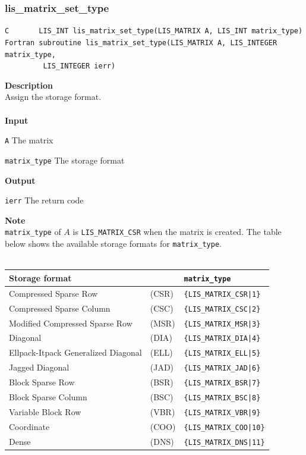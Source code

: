 \documentclass[a4paper]{article}
\newcommand{\namelistlabel}[1]{\mbox{#1}\hfill}
\newenvironment{namelist}[1]{%
\begin{list}{}
  {\let\makelabel\namelistlabel
  \settowidth{\labelwidth}{#1}
  \setlength{\leftmargin}{1.1\labelwidth}}
  }{%
\end{list}}
\begin{document}
\newpage
\subsubsection{lis\_matrix\_set\_type}
\begin{screen}
\verb|C       LIS_INT lis_matrix_set_type(LIS_MATRIX A, LIS_INT matrix_type)|
\verb|Fortran subroutine lis_matrix_set_type(LIS_MATRIX A, LIS_INTEGER matrix_type,|\\
\verb|         LIS_INTEGER ierr)|
\end{screen}
{\bf Description}\\
\indent
Assign the storage format.
\\ \\
\noindent
{\bf Input}
\begin{namelist}{XXXXXXXXXXXXXXXXXXXX}
\item[\tt A] The matrix
\item[\tt matrix\_type] The storage format
\end{namelist}
{\bf Output}
\begin{namelist}{XXXXXXXXXXXXXXXXXXXX}
\item[\tt ierr] The return code
\end{namelist}
\noindent
{\bf Note}\\
\indent
\verb+matrix_type+ of $A$ is \verb+LIS_MATRIX_CSR+ when the matrix is created. 
The table below shows the available storage formats for \verb+matrix_type+.
\\ \\
\begin{minipage}[t]{\textwidth}
\begin{center}
\begin{tabular}{lll}\hline\hline
Storage format  & & \verb|matrix_type| \\ \hline
Compressed Sparse Row & (CSR) & \verb={LIS_MATRIX_CSR|1}= \\
Compressed Sparse Column & (CSC) & \verb={LIS_MATRIX_CSC|2}= \\
Modified Compressed Sparse Row & (MSR) & \verb={LIS_MATRIX_MSR|3}= \\
Diagonal &(DIA) & \verb={LIS_MATRIX_DIA|4}= \\
Ellpack-Itpack Generalized Diagonal &(ELL) & \verb={LIS_MATRIX_ELL|5}= \\
Jagged Diagonal &(JAD) & \verb={LIS_MATRIX_JAD|6}= \\
Block Sparse Row & (BSR) & \verb={LIS_MATRIX_BSR|7}= \\
Block Sparse Column &(BSC) & \verb={LIS_MATRIX_BSC|8}= \\
Variable Block Row &(VBR) & \verb={LIS_MATRIX_VBR|9}= \\
Coordinate & (COO) & \verb={LIS_MATRIX_COO|10}= \\
Dense &	(DNS) & \verb={LIS_MATRIX_DNS|11}= \\
\hline         
\end{tabular}
\end{center}
\end{minipage}
\end{document}

